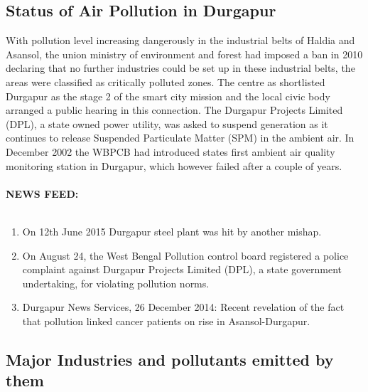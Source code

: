 \subsection{Status of Air Pollution in Durgapur}
With pollution level increasing dangerously in the industrial belts of Haldia and Asansol, the union ministry of environment and forest had imposed a ban in 2010 declaring that no further industries could be set up in these industrial belts, the areas were classified as critically polluted zones. The centre as shortlisted Durgapur as the stage 2 of the smart city mission and the local civic body arranged a public hearing in this connection. The Durgapur Projects Limited (DPL), a state owned power utility, was asked to suspend generation as it continues to release Suspended Particulate Matter (SPM) in the ambient air. In December 2002 the WBPCB had introduced states first ambient air quality monitoring station in Durgapur, which however failed after a couple of years.
\\
\\
\textbf{NEWS FEED:}
\cite{14}
\\
\\
\begin{enumerate}
	\item On 12th June 2015 Durgapur steel plant was hit by another mishap.
	\item On August 24, the West Bengal Pollution control board registered a police complaint against Durgapur Projects Limited (DPL), a state government undertaking, for violating pollution norms.
	\item Durgapur News Services, 26 December 2014: Recent revelation of the fact that pollution linked cancer patients on rise in Asansol-Durgapur.
\end{enumerate}

\subsection{Major Industries and pollutants emitted by them}

